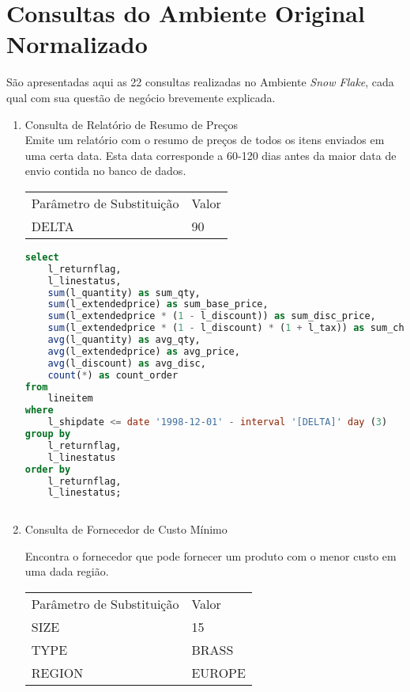 
\chapter{Consultas do Ambiente Original Normalizado}
\label{queries_1}


São apresentadas aqui as 22 consultas realizadas no Ambiente \textit{Snow Flake}, cada qual com sua questão de negócio brevemente explicada.

\begin{enumerate}

\item Consulta de Relatório de Resumo de Preços \\
	Emite um relatório com o resumo de preços de todos os itens enviados em uma certa data. Esta data corresponde a 60-120 dias antes da maior data de envio contida no banco de dados. 
    
\begin{tabular}{ll}
	Parâmetro de Substituição & Valor\\
	DELTA & 90\\
\end{tabular}
    
	\begin{lstlisting}[language=SQL]
select
	l_returnflag,
	l_linestatus,
	sum(l_quantity) as sum_qty,
	sum(l_extendedprice) as sum_base_price,
	sum(l_extendedprice * (1 - l_discount)) as sum_disc_price,
	sum(l_extendedprice * (1 - l_discount) * (1 + l_tax)) as sum_charge,
	avg(l_quantity) as avg_qty,
	avg(l_extendedprice) as avg_price,
	avg(l_discount) as avg_disc,
	count(*) as count_order
from
	lineitem
where
	l_shipdate <= date '1998-12-01' - interval '[DELTA]' day (3)
group by
	l_returnflag,
	l_linestatus
order by
	l_returnflag,
	l_linestatus;
	
	\end{lstlisting}

\item Consulta de Fornecedor de Custo Mínimo

	Encontra o fornecedor que pode fornecer um produto com o menor custo em uma dada região.
	
\begin{tabular}{ll}
	Parâmetro de Substituição & Valor\\
	SIZE & 15\\
	TYPE & BRASS\\
	REGION & EUROPE\\
\end{tabular}


\end{enumerate}
